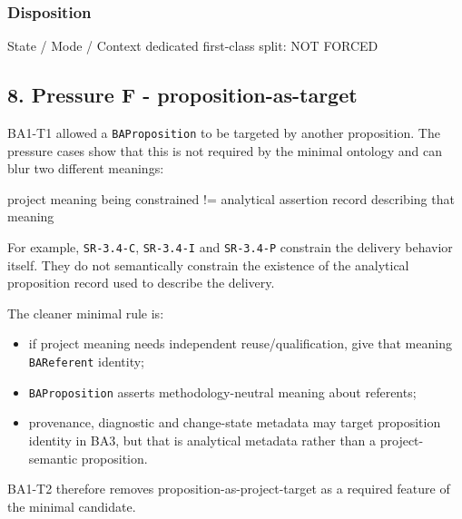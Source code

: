 \documentclass[
  10pt,
]{article}
\newenvironment{Shaded}{}{}
\newcommand{\NormalTok}[1]{#1}
\providecommand{\tightlist}{%
  \setlength{\itemsep}{0pt}\setlength{\parskip}{0pt}}
\begin{document}
\subsubsection{Disposition}\label{disposition-4}

\begin{Shaded}
\begin{Highlighting}[]
\NormalTok{State / Mode / Context dedicated first{-}class split: NOT FORCED}
\end{Highlighting}
\end{Shaded}

\subsection{8. Pressure F -
proposition-as-target}\label{pressure-f---proposition-as-target}

BA1-T1 allowed a \texttt{BAProposition} to be targeted by another
proposition. The pressure cases show that this is not required by the
minimal ontology and can blur two different meanings:

\begin{Shaded}
\begin{Highlighting}[]
\NormalTok{project meaning being constrained}
\NormalTok{        !=}
\NormalTok{analytical assertion record describing that meaning}
\end{Highlighting}
\end{Shaded}

For example, \texttt{SR-3.4-C}, \texttt{SR-3.4-I} and \texttt{SR-3.4-P}
constrain the delivery behavior itself. They do not semantically
constrain the existence of the analytical proposition record used to
describe the delivery.

The cleaner minimal rule is:

\begin{itemize}
\tightlist
\item
  if project meaning needs independent reuse/qualification, give that
  meaning \texttt{BAReferent} identity;
\item
  \texttt{BAProposition} asserts methodology-neutral meaning about
  referents;
\item
  provenance, diagnostic and change-state metadata may target
  proposition identity in BA3, but that is analytical metadata rather
  than a project-semantic proposition.
\end{itemize}

BA1-T2 therefore removes proposition-as-project-target as a required
feature of the minimal candidate.
\end{document}
